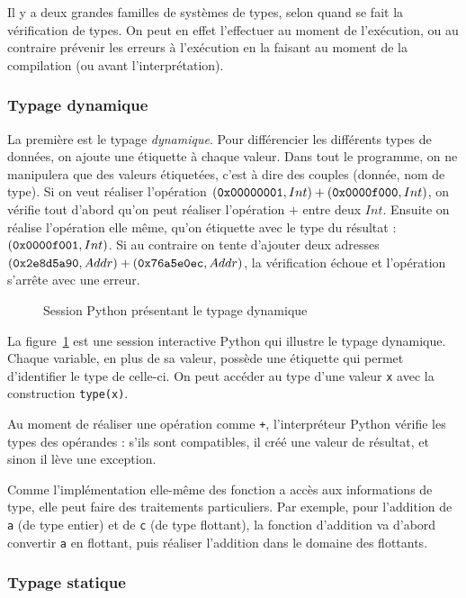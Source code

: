 Il y a deux grandes familles de systèmes de types, selon quand se fait la
vérification de types. On peut en effet l'effectuer au moment de l'exécution, ou
au contraire prévenir les erreurs à l'exécution en la faisant au moment de la
compilation (ou avant l'interprétation).

\subsubsection{Typage dynamique}

La première est le typage \emph{dynamique}. Pour différencier les différents
types de données, on ajoute une étiquette à chaque valeur. Dans tout le
programme, on ne manipulera que des valeurs étiquetées, c'est à dire des couples
(donnée, nom de type). Si on veut réaliser l'opération $(\texttt{0x00000001}, Int) +
(\texttt{0x0000f000}, Int)$, on vérifie tout d'abord qu'on peut réaliser l'opération
$+$ entre deux $Int$. Ensuite on réalise l'opération elle même, qu'on étiquette
avec le type du résultat : $(\texttt{0x0000f001}, Int)$. Si au contraire on tente
d'ajouter deux adresses $(\texttt{0x2e8d5a90}, Addr) + (\texttt{0x76a5e0ec}, Addr)$, la
vérification échoue et l'opération s'arrête avec une erreur.

\begin{figure}
  \caption{Session Python présentant le typage dynamique}
  \label{fig:typage-dynamique}
\end{figure}

La figure~\ref{fig:typage-dynamique} est une session interactive Python qui
illustre le typage dynamique. Chaque variable, en plus de sa valeur, possède une
étiquette qui permet d'identifier le type de celle-ci. On peut accéder au type
d'une valeur \texttt{x} avec la construction \texttt{type(x)}.

Au moment de réaliser une opération comme \texttt{+}, l'interpréteur Python
vérifie les types des opérandes : s'ils sont compatibles, il créé une valeur de
résultat, et sinon il lève une exception.

Comme l'implémentation elle-même des fonction a accès aux informations de type,
elle peut faire des traitements particuliers. Par exemple, pour l'addition de
\texttt{a} (de type entier) et de \texttt{c} (de type flottant), la fonction
d'addition va d'abord convertir \texttt{a} en flottant, puis réaliser l'addition
dans le domaine des flottants.

\subsubsection{Typage statique}


